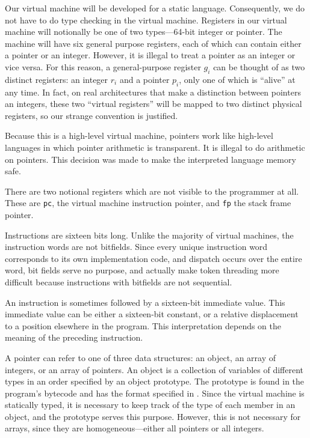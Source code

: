 		Our virtual machine will be developed for a static language. Consequently, we do not have to do type checking in the virtual machine. Registers in our virtual machine will notionally be one of two types---64-bit integer or pointer. The machine will have six general purpose registers, each of which can contain either a pointer or an integer. However, it is illegal to treat a pointer as an integer or vice versa. For this reason, a general-purpose register $g_i$ can be thought of as two distinct registers: an integer $r_i$ and a pointer $p_i$, only one of which is ``alive'' at any time. In fact, on real architectures that make a distinction between pointers an integers, these two ``virtual registers'' will be mapped to two distinct physical registers, so our strange convention is justified.
		
		Because this is a high-level virtual machine, pointers work like high-level languages in which pointer arithmetic is transparent. It is illegal to do arithmetic on pointers. This decision was made to make the interpreted language memory safe.
		
		There are two notional registers which are not visible to the programmer at all. These are \texttt{pc}, the virtual machine instruction pointer, and \texttt{fp} the stack frame pointer.
		
		Instructions are sixteen bits long. Unlike the majority of virtual machines, the instruction words are not bitfields. Since every unique instruction word corresponds to its own implementation code, and dispatch occurs over the entire word, bit fields serve no purpose, and actually make token threading more difficult because instructions with bitfields are not sequential.
		
		An instruction is sometimes followed by a sixteen-bit immediate value. This immediate value can be either a sixteen-bit constant, or a relative displacement to a position elsewhere in the program. This interpretation depends on the meaning of the preceding instruction.
		
		A pointer can refer to one of three data structures: an object, an array of integers, or an array of pointers. An object is a collection of variables of different types in an order specified by an object prototype. The prototype is found in the program's bytecode and has the format specified in . Since the virtual machine is statically typed, it is necessary to keep track of the type of each member in an object, and the prototype serves this purpose. However, this is not necessary for arrays, since they are homogeneous---either all pointers or all integers.
		
